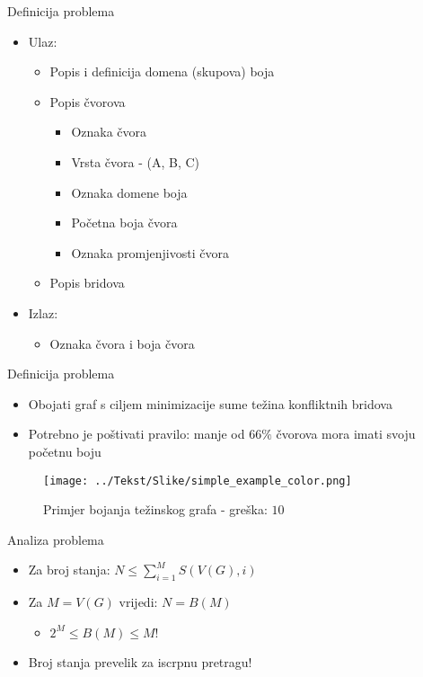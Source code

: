 \documentclass[utf8]{beamer}
\begin{document}
\begin{frame}{Definicija problema}
	\begin{itemize}
		\item Ulaz:
			\begin{itemize}
				\item Popis i definicija domena (skupova) boja
				\pause
				\item Popis čvorova
					\begin{itemize}
						\item Oznaka čvora
						\item Vrsta čvora - (A, B, C)
						\item Oznaka domene boja
						\item Početna boja čvora
						\item Oznaka promjenjivosti čvora
					\end{itemize}
				\pause
				\item Popis bridova
			\end{itemize}
		\pause
		\item Izlaz:
			\begin{itemize}
				\item Oznaka čvora i boja čvora
			\end{itemize}
	\end{itemize}
\end{frame}

\begin{frame}{Definicija problema}
	\begin{itemize}
		\item Obojati graf s ciljem minimizacije sume težina konfliktnih bridova
		\item Potrebno je poštivati pravilo: manje od $66\%$ čvorova mora imati svoju početnu boju
	\end{itemize}
	\begin{figure}[h]
  \caption{Primjer bojanja težinskog grafa - greška: $10$}
  \centering
    \texttt{[image: ../Tekst/Slike/simple\_example\_color.png]}
	\end{figure}
\end{frame}

\begin{frame}{Analiza problema}
	\begin{itemize}
		\item Za broj stanja: $N \le \sum_{i=1}^{M} S(V(G), i)$
		\pause
		\item Za $M=V(G)$ vrijedi: $N=B(M)$
		\begin{itemize}
			\item $2^M \le B(M) \le M!$
		\end{itemize}
		\pause
		\item Broj stanja prevelik za iscrpnu pretragu!
	\end{itemize}
\end{frame}
\end{document}
